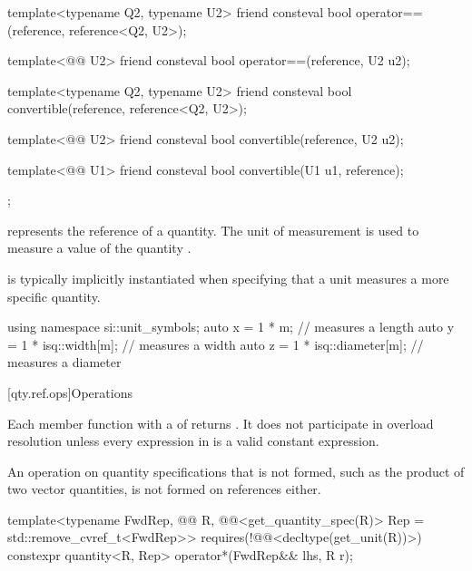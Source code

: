 \begin{codeblock}
{{  template<typename Q2, typename U2>
  friend consteval bool operator==(reference, reference<Q2, U2>);

  template<@@ U2>
  friend consteval bool operator==(reference, U2 u2);

  template<typename Q2, typename U2>
  friend consteval bool convertible(reference, reference<Q2, U2>);

  template<@@ U2>
  friend consteval bool convertible(reference, U2 u2);

  template<@@ U1>
  friend consteval bool convertible(U1 u1, reference);
};

}
\end{codeblock}

\pnum
{} represents the reference of a quantity.
The unit of measurement 
is used to measure a value of the quantity .
\begin{note}
 is typically implicitly instantiated
when specifying that a unit measures a more specific quantity.
\begin{example}
\begin{codeblock}
using namespace si::unit_symbols;
auto x = 1 * m;                 // measures a length
auto y = 1 * isq::width[m];     // measures a width
auto z = 1 * isq::diameter[m];  // measures a diameter
\end{codeblock}
\end{example}
\end{note}

[qty.ref.ops]{Operations}

\pnum
Each member function with a 
of 
returns \tcode{\{\}}.
It does not participate in overload resolution unless
every expression in  is a valid constant expression.
\begin{note}
An operation on quantity specifications that is not formed,
such as the product of two vector quantities, is not formed on references either.
\end{note}

\begin{itemdecl}
template<typename FwdRep, @@ R,
         @@<get_quantity_spec(R{})> Rep = std::remove_cvref_t<FwdRep>>
  requires(!@@<decltype(get_unit(R{}))>)
constexpr quantity<R{}, Rep> operator*(FwdRep&& lhs, R r);
\end{itemdecl}

